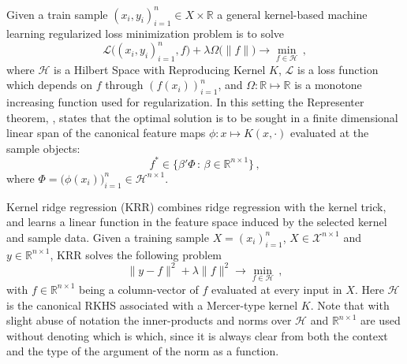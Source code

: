\documentclass[a4paper,14pt]{extarticle}
\newcommand{\Hcal}{\mathcal{H}}
\newcommand{\Xcal}{\mathcal{X}}
\newcommand{\Real}{\mathbb{R}}
\newcommand{\Lcal}{\mathcal{L}}
\begin{document}
Given a train sample $(x_i, y_i)_{i=1}^n \in X\times \Real$ a general kernel-based
machine learning regularized loss minimization problem is to solve
\begin{equation}
  \Lcal\bigl((x_i, y_i)_{i=1}^n, f\bigr)
    + \lambda \Omega\bigl(\|f\|\bigr)
    \to \min_{f\in \Hcal} \,,
\end{equation}
where $\Hcal$ is a Hilbert Space with Reproducing Kernel $K$, $\Lcal$ is a loss
function which depends on $f$ through $(f(x_i))_{i=1}^n$, and $\Omega:\Real\mapsto\Real$
is a monotone increasing function used for regularization. In this setting the Representer
theorem, \cite{scholkopf2002}, states that the optimal solution is to be sought in a
finite dimensional linear span of the canonical feature maps $\phi: x\mapsto K(x, \cdot)$
evaluated at the sample objects:
\begin{equation*}
  f^* \in \bigl\{ \beta'\Phi\,:\, \beta \in \Real^{n\times 1} \bigr\} \,,
\end{equation*}
where $\Phi = \bigl(\phi(x_i)\bigr)_{i=1}^n \in \Hcal^{n\times 1}$.

Kernel ridge regression (KRR) combines ridge regression with the kernel trick, and
learns a linear function in the feature space induced by the selected kernel and
sample data. Given a training sample $X = (x_i)_{i=1}^n$, $X\in \Xcal^{n\times 1}$
and $y \in \Real^{n\times 1}$, KRR solves the following problem
\begin{equation*}
  \|y - f\|^2 + \lambda \|f\|^2 \to \min_{f \in \Hcal} \,,
\end{equation*}
with $f \in \Real^{n\times 1}$ being a column-vector of $f$ evaluated at every input
in $X$. Here $\Hcal$ is the canonical RKHS associated with a Mercer-type kernel $K$.
Note that with slight abuse of notation the inner-products and norms over $\Hcal$
and $\Real^{n\times 1}$ are used without denoting which is which, since it is always
clear from both the context and the type of the argument of the norm as a function.
\end{document}
